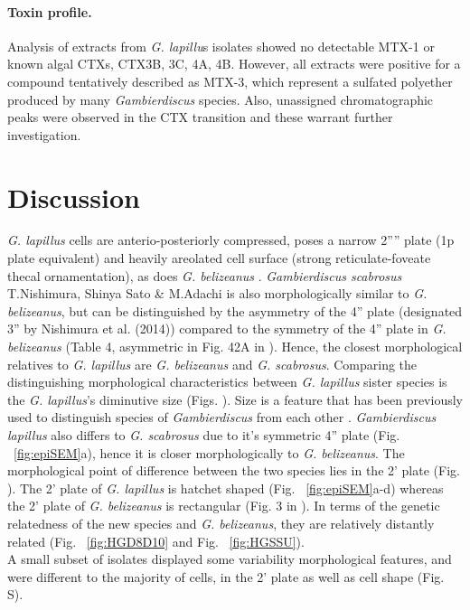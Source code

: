 \documentclass[12pt]{article}
\begin{document}
\paragraph{Toxin profile.}
Analysis of extracts from \textit{G. lapillu}s isolates showed no detectable MTX-1 or known algal CTXs, CTX3B, 3C, 4A, 4B. 
However, all extracts were positive for a compound tentatively described as MTX-3, which represent a sulfated polyether produced by many \textit{Gambierdiscus} species. 
Also, unassigned chromatographic peaks were observed in the CTX transition and these warrant further investigation.

\newpage
\section{Discussion}
\emph{G. lapillus} cells are anterio-posteriorly compressed, poses a narrow 2'''' plate (1p plate equivalent) and heavily areolated cell surface (strong reticulate-foveate thecal ornamentation), as does \emph{G. belizeanus}  \citep{litaker2009taxonomy}.
 \emph{Gambierdiscus scabrosus} T.Nishimura, Shinya Sato \& M.Adachi is also morphologically similar to \emph{G. belizeanus}, but can be distinguished by the asymmetry of the 4'' plate (designated 3'' by Nishimura et al. (2014)) compared to the symmetry of the 4'' plate in \emph{G. belizeanus} (Table 4, asymmetric in Fig. 42A in \citep{hoppenrath2014marine}). 
 Hence, the closest morphological relatives to \emph{G. lapillus} are \emph{G. belizeanus} and \emph{G. scabrosus}. 
Comparing the distinguishing morphological characteristics between \emph{G. lapillus} sister species is the \textit{G. lapillus}'s diminutive size (Figs. ). %
 Size is a feature that has been previously used to distinguish species of \emph{Gambierdiscus} from each other \citep{litaker2009taxonomy}. 
\emph{Gambierdiscus lapillus} also differs to \emph{G. scabrosus} due to it's symmetric 4'' plate (Fig. ~\ref{fig:epiSEM}a), hence it is closer morphologically to \emph{G. belizeanus}. %
The morphological point of difference between the two species lies in the 2' plate (Fig. ). %
The 2' plate of \emph{G. lapillus} is hatchet shaped (Fig. ~\ref{fig:epiSEM}a-d) whereas the 2' plate of \emph{G. belizeanus} is rectangular (Fig. 3 in \citep{faust1995observation}). %
In terms of the genetic relatedness of the new species and \textit{G. belizeanus}, they are relatively distantly related (Fig. ~\ref{fig:HGD8D10} and Fig. ~\ref{fig:HGSSU}). \\
A small subset of isolates displayed some variability morphological features, and were different to the majority of cells, in the 2' plate as well as cell shape (Fig. S). %
\end{document}
